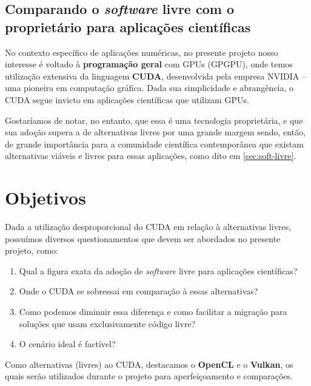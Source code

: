 \documentclass[10pt, a4paper, draftcls, conference, onecolumn]{IEEEtran}
\begin{document}
\subsection{Comparando o \textit{software} livre com o proprietário para aplicações científicas}

No contexto específico de aplicações numéricas, no presente projeto nosso
interesse é voltado à \textbf{programação geral} com GPUs (GPGPU), onde temos
utilização extensiva da linguagem \textbf{CUDA}, desenvolvida pela empresa
NVIDIA -- uma pioneira em computação gráfica. Dada sua simplicidade e
abrangência, o CUDA segue invicto em aplicações científicas que utilizam GPUs.

Gostaríamos de notar, no entanto, que essa é uma tecnologia proprietária, e que
sua adoção supera a de alternativas livres por uma grande margem sendo, então,
de grande importância para a comunidade científica contemporânea que existam
alternativas viáveis e livres para essas aplicações, como dito em \ref{sec:soft-livre}.


\section{Objetivos}

Dada a utilização desproporcional do CUDA em relação à alternativas livres,
possuímos diversos questionamentos que devem ser abordados no presente
projeto, como:

\begin{enumerate}
    \item Qual a figura exata da adoção de \textit{software} livre para aplicações científicas?
    \item Onde o CUDA se sobressai em comparação à essas alternativas?
    \item Como podemos diminuir essa diferença e como facilitar a migração para soluções que usam exclusivamente código livre?
    \item O cenário ideal é factível?
\end{enumerate}

Como alternativas (livres) ao CUDA, destacamos o \textbf{OpenCL} e o
\textbf{Vulkan}, os quais serão utilizados durante o projeto para
aperfeiçoamento e comparações.
\end{document}
